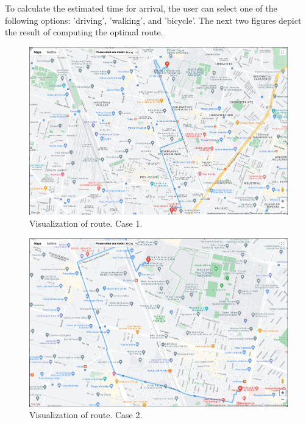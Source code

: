 \documentclass[sustainability,article,submit,pdftex,moreauthors]{Definitions/mdpi}
\begin{document}
To calculate the estimated time for arrival, the user can select one of the following options: 'driving', 'walking', and 'bicycle'. The next two figures depict the result of computing the optimal route.


\begin{figure}[H]
\includegraphics[width=10.5 cm]{ruta_uno.png}
\caption{Visualization of route. Case 1.\label{figure_ruta_uno}}
\end{figure}
\unskip

\begin{figure}[H]
\includegraphics[width=10.5 cm]{ruta_dos.png}
\caption{Visualization of route. Case 2.\label{figure_ruta_dos}}
\end{figure}
\unskip
\end{document}
